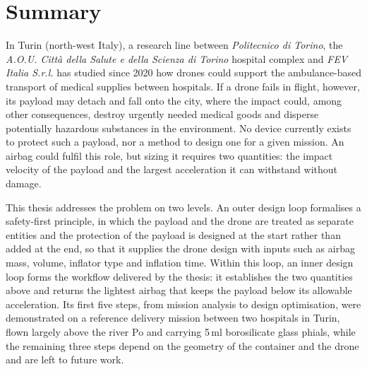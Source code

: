 \chapter*{Summary}

In Turin (north-west Italy), a research line between \textit{Politecnico di Torino}, the \textit{A.O.U. Città della Salute e della Scienza di Torino} hospital complex and \textit{FEV Italia S.r.l.} has studied since 2020 how drones could support the ambulance-based transport of medical supplies between hospitals. If a drone fails in flight, however, its payload may detach and fall onto the city, where the impact could, among other consequences, destroy urgently needed medical goods and disperse potentially hazardous substances in the environment. No device currently exists to protect such a payload, nor a method to design one for a given mission. An airbag could fulfil this role, but sizing it requires two quantities: the impact velocity of the payload and the largest acceleration it can withstand without damage.

This thesis addresses the problem on two levels. An outer design loop formalises a safety-first principle, in which the payload and the drone are treated as separate entities and the protection of the payload is designed at the start rather than added at the end, so that it supplies the drone design with inputs such as airbag mass, volume, inflator type and inflation time. Within this loop, an inner design loop forms the workflow delivered by the thesis: it establishes the two quantities above and returns the lightest airbag that keeps the payload below its allowable acceleration. Its first five steps, from mission analysis to design optimisation, were demonstrated on a reference delivery mission between two hospitals in Turin, flown largely above the river Po and carrying 5\,ml borosilicate glass phials, while the remaining three steps depend on the geometry of the container and the drone and are left to future work.


